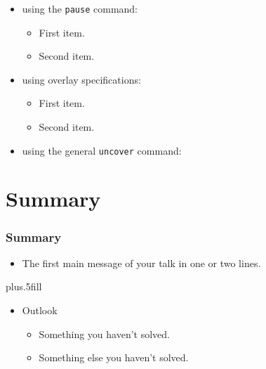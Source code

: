 \documentclass{beamer}
\begin{document}
\begin{frame}
\begin{itemize}
  \item using the \texttt{pause} command:
  \begin{itemize}
    \item First item.
    \pause
    \item Second item.
  \end{itemize}
  \item using overlay specifications:
  \begin{itemize}
    \item<3-> First item.
    \item<4-> Second item.
  \end{itemize}
  \item using the general \texttt{uncover} command:
  \begin{itemize}
  \end{itemize}
\end{itemize}
\end{frame}



\section*{Summary}


\begin{frame}
\frametitle<presentation>{Summary}

\begin{itemize}
  \item The \alert{first main message} of your talk in one or two lines.
\end{itemize}

\vskip0pt plus.5fill
\begin{itemize}
  \item Outlook
  \begin{itemize}
    \item Something you haven't solved.
    \item Something else you haven't solved.
  \end{itemize}
\end{itemize}

\end{frame}
\end{document}
